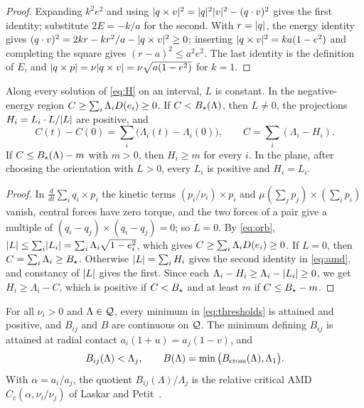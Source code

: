 \begin{proof}
Expanding $k^2e^2$ and using $\lvert q\times v\rvert^2=\lvert q\rvert^2\lvert v\rvert^2-(q\cdot v)^2$ gives the first identity; substitute $2E=-k/a$ for the second. With $r=\lvert q\rvert$, the energy identity gives $(q\cdot v)^2=2kr-kr^2/a-\lvert q\times v\rvert^2\ge0$; inserting $\lvert q\times v\rvert^2=ka(1-e^2)$ and completing the square gives $(r-a)^2\le a^2e^2$. The last identity is the definition of $E$, and $\lvert q\times p\rvert=\nu\lvert q\times v\rvert=\nu\sqrt{a(1-e^2)}$ for $k=1$.
\end{proof}

\begin{lemma}
\label{lem:amd}
Along every solution of \eqref{eq:H} on an interval, $L$ is constant. In the negative-energy region $C\ge\sum_i\Lambda_iD(e_i)\ge0$. If $C<B_\star(\Lambda)$, then $L\ne0$, the projections $H_i=L_i\cdot L/\lvert L\rvert$ are positive, and
\begin{equation}
\label{eq:amd}
C(t)-C(0)=\sum_i\big(\Lambda_i(t)-\Lambda_i(0)\big),\qquad C=\sum_i(\Lambda_i-H_i).
\end{equation}
If $C\le B_\star(\Lambda)-m$ with $m>0$, then $H_i\ge m$ for every $i$. In the plane, after choosing the orientation with $L>0$, every $L_i$ is positive and $H_i=L_i$.
\end{lemma}

\begin{proof}
In $\frac{d}{dt}\sum_iq_i\times p_i$ the kinetic terms $(p_i/\nu_i)\times p_i$ and $\mu(\sum_jp_j)\times(\sum_ip_i)$ vanish, central forces have zero torque, and the two forces of a pair give a multiple of $(q_i-q_j)\times(q_i-q_j)=0$; so $\dot L=0$. By \eqref{eq:orb}, $\lvert L\rvert\le\sum_i\lvert L_i\rvert=\sum_i\Lambda_i\sqrt{1-e_i^2}$, which gives $C\ge\sum_i\Lambda_iD(e_i)\ge0$. If $L=0$, then $C=\sum_i\Lambda_i\ge B_\star$. Otherwise $\lvert L\rvert=\sum_iH_i$ gives the second identity in \eqref{eq:amd}, and constancy of $\lvert L\rvert$ gives the first. Since each $\Lambda_i-H_i\ge\Lambda_i-\lvert L_i\rvert\ge0$, we get $H_i\ge\Lambda_i-C$, which is positive if $C<B_\star$ and at least $m$ if $C\le B_\star-m$.
\end{proof}

\begin{lemma}
\label{lem:threshold}
For all $\nu_i>0$ and $\Lambda\in\mathcal{Q}$, every minimum in \eqref{eq:thresholds} is attained and positive, and $B_{ij}$ and $B$ are continuous on $\mathcal{Q}$. The minimum defining $B_{ij}$ is attained at radial contact $a_i(1+u)=a_j(1-v)$, and
\begin{equation}
\label{eq:Bsharp}
B_{ij}(\Lambda)<\Lambda_j,\qquad B(\Lambda)=\min\big(B_{\mathrm{cross}}(\Lambda),\Lambda_1\big).
\end{equation}
With $\alpha=a_i/a_j$, the quotient $B_{ij}(\Lambda)/\Lambda_j$ is the relative critical AMD $C_c(\alpha,\nu_i/\nu_j)$ of Laskar and Petit~\cite[\S\S3.1--3.2]{LP17}.
\end{lemma}

